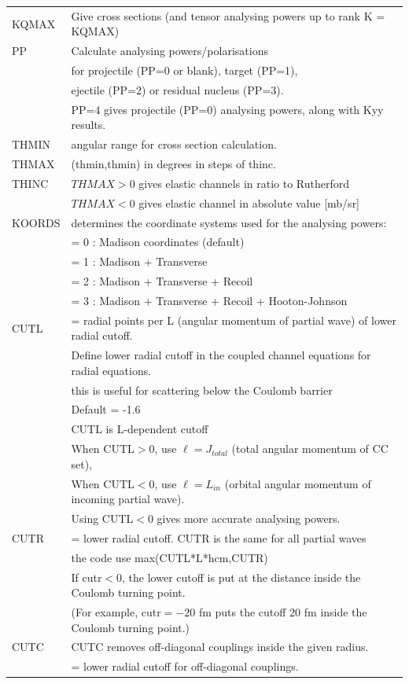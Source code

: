 \documentclass[11pt]{book}
\begin{document}
\begin{table}[h]
\begin{tabular}{|l|l|}
\hline 
KQMAX & Give cross sections 
       (and tensor analysing powers up to rank K = KQMAX)\\
PP & Calculate analysing powers/polarisations \\
   & for projectile (PP=0 or blank), target (PP=1), \\
   & ejectile (PP=2) or residual nucleus (PP=3). \\
   & PP=4 gives projectile (PP=0) analysing powers, 
     along with Kyy results.\\
\hline 
THMIN & angular range for cross section calculation. \\
THMAX & (thmin,thmin) in degrees in steps of thinc.  \\
THINC & $THMAX>0$ gives elastic channels in ratio to Rutherford\\
      & $THMAX<0$ gives elastic channel in absolute value [mb/sr]\\ 
\hline 
KOORDS & determines the coordinate systems used for the analysing powers: \\
       & = 0 : Madison coordinates (default) \\
       & = 1 : Madison + Transverse\\  
       & = 2 : Madison + Transverse + Recoil\\
       & = 3 : Madison + Transverse + Recoil + Hooton-Johnson\\ 
\hline 
CUTL &= radial points per L (angular momentum of partial wave) of lower radial cutoff. \\
     & Define lower radial cutoff in the coupled channel equations for radial equations. \\
     & this is useful for scattering below the Coulomb barrier \\
     &  Default = -1.6\\
     & CUTL is L-dependent cutoff \\
     & When CUTL$>$0, use $\ell=J_{total}$ (total angular momentum of CC set),\\
     & When CUTL$<$0, use $\ell=L_{in}$ (orbital angular momentum of incoming partial wave).\\
     & Using  CUTL$<$0 gives more accurate analysing powers.\\
CUTR &= lower radial cutoff. CUTR is the same for all partial waves \\
     & the code use max(CUTL*L*hcm,CUTR) \\
     & If cutr$<$0, the lower cutoff is put at the distance inside the Coulomb turning point.\\
     &(For example, cutr$=-20$ fm puts the cutoff 20 fm inside the Coulomb turning point.)\\
CUTC & CUTC removes off-diagonal couplings inside the given radius. \\ 
     & = lower radial cutoff for off-diagonal couplings.\\
\hline 
\end{tabular}
\end{table}
\end{document}

